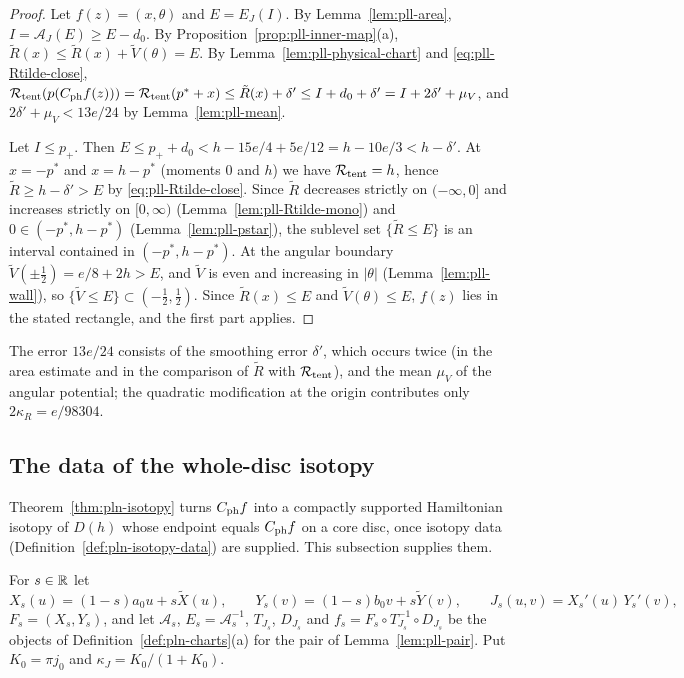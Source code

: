 \begin{proof}
Let $f(z)=(x,\theta)$ and $E=E_J(I)$. By Lemma~\ref{lem:pll-area}, $I=\mathcal A_J(E)\ge E-d_0$. By
Proposition~\ref{prop:pll-inner-map}(a), $\tilde R(x)\le\tilde R(x)+\tilde V(\theta)=E$. By
Lemma~\ref{lem:pll-physical-chart} and \eqref{eq:pll-Rtilde-close},
$\mathcal{R}_{\rm tent}(p(C_{\rm ph}f(z)))=\mathcal{R}_{\rm tent}(p^*+x)\le\tilde R(x)+\delta'\le I+d_0+\delta'=I+2\delta'+\mu_V$,
and $2\delta'+\mu_V<13e/24$ by Lemma~\ref{lem:pll-mean}.

Let $I\le p_+$. Then $E\le p_++d_0<h-15e/4+5e/12=h-10e/3<h-\delta'$. At $x=-p^*$ and $x=h-p^*$ (moments $0$ and
$h$) we have $\mathcal{R}_{\rm tent}=h$, hence $\tilde R\ge h-\delta'>E$ by \eqref{eq:pll-Rtilde-close}. Since $\tilde R$
decreases strictly on $(-\infty,0]$ and increases strictly on $[0,\infty)$ (Lemma~\ref{lem:pll-Rtilde-mono}) and
$0\in(-p^*,h-p^*)$ (Lemma~\ref{lem:pll-pstar}), the sublevel set $\{\tilde R\le E\}$ is an interval contained in
$(-p^*,h-p^*)$. At the angular boundary $\tilde V(\pm\frac12)=e/8+2h>E$, and $\tilde V$ is even and increasing in
$|\theta|$ (Lemma~\ref{lem:pll-wall}), so $\{\tilde V\le E\}\subset(-\frac12,\frac12)$. Since $\tilde R(x)\le E$ and
$\tilde V(\theta)\le E$, $f(z)$ lies in the stated rectangle, and the first part applies.
\end{proof}

The error $13e/24$ consists of the smoothing error $\delta'$, which occurs twice (in the area estimate and in the
comparison of $\tilde R$ with $\mathcal{R}_{\rm tent}$), and the mean $\mu_V$ of the angular potential; the quadratic
modification at the origin contributes only $2\kappa_R=e/98304$.

\subsection{The data of the whole-disc isotopy}\label{sec:pll-data}

Theorem~\ref{thm:pln-isotopy} turns $C_{\rm ph}f$ into a compactly supported Hamiltonian isotopy of $D(h)$ whose
endpoint equals $C_{\rm ph}f$ on a core disc, once isotopy data (Definition~\ref{def:pln-isotopy-data}) are supplied.
This subsection supplies them.

\begin{definition}\label{def:pll-density}
For $s\in\mathbb{R}$ let
\[
 X_s(u)=(1-s)a_0u+s\tilde X(u),\qquad Y_s(v)=(1-s)b_0v+s\tilde Y(v),\qquad J_s(u,v)=X_s'(u)\,Y_s'(v),
\]
$F_s=(X_s,Y_s)$, and let $\mathcal A_s$, $E_s=\mathcal A_s^{-1}$, $T_{J_s}$, $D_{J_s}$ and
$f_s=F_s\circ T_{J_s}^{-1}\circ D_{J_s}$ be the objects of Definition~\ref{def:pln-charts}(a) for the pair of
Lemma~\ref{lem:pll-pair}. Put $K_0=\pi j_0$ and $\kappa_J=K_0/(1+K_0)$.
\end{definition}

